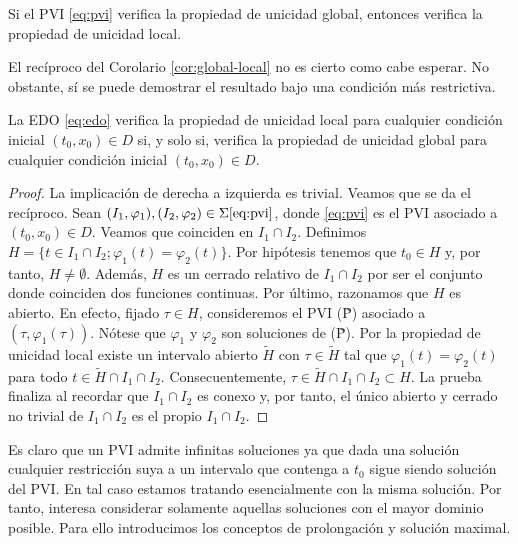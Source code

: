 \documentclass{article}
\begin{document}
\begin{corollary} \label{cor:global-local} Si el PVI \eqref{eq:pvi} verifica la propiedad de
  unicidad global, entonces verifica la propiedad de unicidad local.
\end{corollary}

El recíproco del Corolario \ref{cor:global-local} no es cierto como cabe esperar. No obstante, sí se
puede demostrar el resultado bajo una condición más restrictiva.

\begin{proposition} \label{prop:local-global} La EDO \eqref{eq:edo} verifica la propiedad de
  unicidad local para cualquier condición inicial $(t_0, x_0) \in D$ si, y solo si, verifica la
  propiedad de unicidad global para cualquier condición inicial $(t_0, x_0) \in D$.
\end{proposition}
\begin{proof}
  La implicación de derecha a izquierda es trivial. Veamos que se da el recíproco. Sean
  $(I_1, \varphi_1), (I_2, \varphi_2) \in \Sigma \eqref{eq:pvi}$, donde \eqref{eq:pvi} es el PVI
  asociado a $(t_0, x_0) \in D$. Veamos que coinciden en $I_1 \cap I_2$. Definimos
  $H = \{ t \in I_1 \cap I_2; \varphi_1(t) = \varphi_2(t)\}$. Por hipótesis tenemos que $t_0 \in H$
  y, por tanto, $H \neq \emptyset$. Además, $H$ es un cerrado relativo de $I_1 \cap I_2$ por ser el
  conjunto donde coinciden dos funciones continuas. Por último, razonamos que $H$ es abierto. En
  efecto, fijado $\tau \in H$, consideremos el PVI (\~P) asociado a $(\tau,
  \varphi_1(\tau))$. Nótese que $\varphi_1$ y $\varphi_2$ son soluciones de (\~P). Por la propiedad
  de unicidad local existe un intervalo abierto $\tilde{H}$ con $\tau \in \tilde{H}$ tal que
  $\varphi_1(t) = \varphi_2(t)$ para todo $t \in \tilde{H} \cap I_1 \cap I_2$.  Consecuentemente,
  $\tau \in \tilde{H} \cap I_1 \cap I_2 \subset H$. La prueba finaliza al recordar que
  $I_1 \cap I_2$ es conexo y, por tanto, el único abierto y cerrado no trivial de $I_1 \cap I_2$ es
  el propio $I_1 \cap I_2$.
\end{proof}

Es claro que un PVI admite infinitas soluciones ya que dada una solución cualquier restricción suya
a un intervalo que contenga a $t_0$ sigue siendo solución del PVI. En tal caso estamos tratando
esencialmente con la misma solución. Por tanto, interesa considerar solamente aquellas soluciones
con el mayor dominio posible. Para ello introducimos los conceptos de prolongación y solución
maximal.
\end{document}
